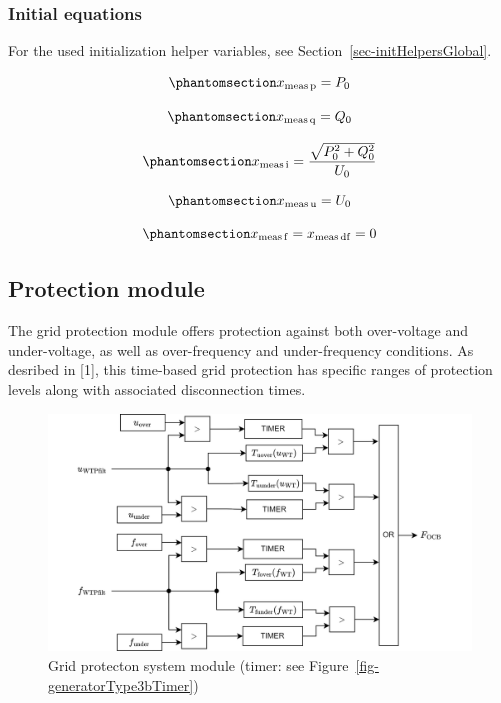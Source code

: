 \documentclass[
  a4paper,
  DIV=11,
  numbers=noendperiod]{scrartcl}
\begin{document}
\subsubsection{Initial equations}\label{initial-equations-5}

For the used initialization helper variables, see
Section~\ref{sec-initHelpersGlobal}.

\begin{equation}\phantomsection\label{eq-initXmeasp}{
x_\mathrm{meas\,p} = P_0
}\end{equation}

\begin{equation}\phantomsection\label{eq-initXmeasq}{
x_\mathrm{meas\,q} = Q_0
}\end{equation}

\begin{equation}\phantomsection\label{eq-initXmeasi}{
x_\mathrm{meas\,i} = \frac{\sqrt{P_0^2 + Q_0^2}}{U_0}
}\end{equation}

\begin{equation}\phantomsection\label{eq-initXmeasu}{
x_\mathrm{meas\,u} = U_0
}\end{equation}

\begin{equation}\phantomsection\label{eq-initXmeasf}{
x_\mathrm{meas\,f} = x_\mathrm{meas\,df} = 0
}\end{equation}

\subsection{Protection module}\label{protection-module}

The grid protection module offers protection against both over-voltage
and under-voltage, as well as over-frequency and under-frequency
conditions. As desribed in {[}1{]}, this time-based grid protection has
specific ranges of protection levels along with associated disconnection
times.

\begin{figure}[H]

{\centering \includegraphics{drawings/Grid_Protection.drawio.png}

}

\caption{Grid protecton system module (timer: see
Figure~\ref{fig-generatorType3bTimer})}

\end{figure}%
\end{document}
